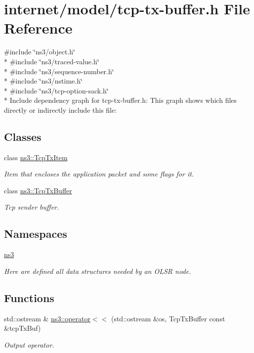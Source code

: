 \hypertarget{tcp-tx-buffer_8h}{}\section{internet/model/tcp-\/tx-\/buffer.h File Reference}
\label{tcp-tx-buffer_8h}
{\ttfamily \#include \char`\"{}ns3/object.\+h\char`\"{}}\\*
{\ttfamily \#include \char`\"{}ns3/traced-\/value.\+h\char`\"{}}\\*
{\ttfamily \#include \char`\"{}ns3/sequence-\/number.\+h\char`\"{}}\\*
{\ttfamily \#include \char`\"{}ns3/nstime.\+h\char`\"{}}\\*
{\ttfamily \#include \char`\"{}ns3/tcp-\/option-\/sack.\+h\char`\"{}}\\*
Include dependency graph for tcp-\/tx-\/buffer.h\+:
This graph shows which files directly or indirectly include this file\+:
\subsection*{Classes}
\begin{DoxyCompactItemize}
\item 
class \hyperlink{classns3_1_1TcpTxItem}{ns3\+::\+Tcp\+Tx\+Item}
\begin{DoxyCompactList}\small\item\em Item that encloses the application packet and some flags for it. \end{DoxyCompactList}\item 
class \hyperlink{classns3_1_1TcpTxBuffer}{ns3\+::\+Tcp\+Tx\+Buffer}
\begin{DoxyCompactList}\small\item\em Tcp sender buffer. \end{DoxyCompactList}\end{DoxyCompactItemize}
\subsection*{Namespaces}
\begin{DoxyCompactItemize}
\item 
 \hyperlink{namespacens3}{ns3}
\begin{DoxyCompactList}\small\item\em Here are defined all data structures needed by an O\+L\+SR node. \end{DoxyCompactList}\end{DoxyCompactItemize}
\subsection*{Functions}
\begin{DoxyCompactItemize}
\item 
std\+::ostream \& \hyperlink{namespacens3_a09c6eef48efdd7458e7bd81b78895c83}{ns3\+::operator$<$$<$} (std\+::ostream \&os, Tcp\+Tx\+Buffer const \&tcp\+Tx\+Buf)
\begin{DoxyCompactList}\small\item\em Output operator. \end{DoxyCompactList}\end{DoxyCompactItemize}
